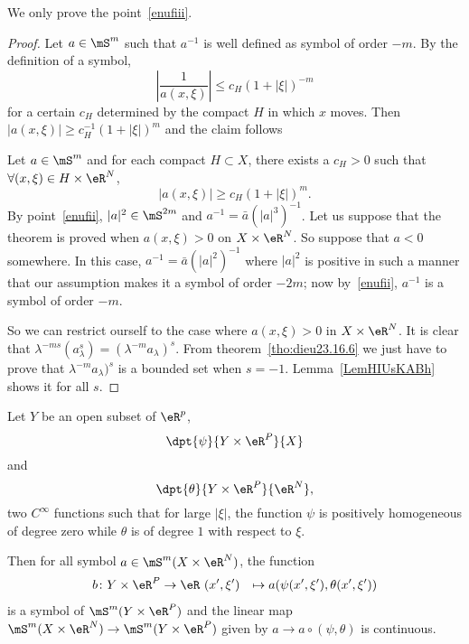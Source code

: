We only prove the point~\ref{enufiii}.

\begin{proof}
	Let $a\in\mS^m$ such that $a^{-1}$ is well defined as symbol of order $-m$. By the definition of a symbol,
	\begin{equation}
		\left| \frac{1}{a(x,\xi)}  \right|\leq c_H(1+|\xi|)^{-m}
	\end{equation}
	for a certain $c_H$ determined by the compact $H$ in which $x$ moves. Then $|a(x,\xi)|\geq c_H^{-1}(1+|\xi|)^m$ and the claim follows

	 Let $a\in\mS^m$ and for each compact $H\subset X$, there exists a $c_H>0$ such that $\forall(x,\xi)\in H\times \eR^N$,
	\[
		|a(x,\xi)|\geq c_H(1+|\xi|)^m.
	\]
	By point~\ref{enufii}, $|a|^2\in\mS^{2m}$ and $a^{-1}=\bar a (|a|^3)^{-1}$. Let us suppose that the theorem is proved when $a(x,\xi)>0$ on $X\times\eR^N$. So suppose that $a<0$ somewhere. In this case, $a^{-1}=\bar a(|a|^2)^{-1}$ where $|a|^2$ is positive in such a manner that our assumption makes it a symbol of order $-2m$; now by~\ref{enufii}, $a^{-1}$ is a symbol of order $-m$.

	So we can restrict ourself to the case where $a(x,\xi)>0$ in $X\times\eR^N$. It is clear that $\lambda^{-ms}(a_{\lambda}^s)=(\lambda^{-m}a_{\lambda})^s$. From theorem~\ref{tho:dieu23.16.6} we just have to prove that
	$\lambda^{-m}a_{\lambda})^s$ is a bounded set when $s=-1$. Lemma~\ref{LemHIUsKABh} shows it for all $s$.

\end{proof}

\begin{proposition}
	Let $Y$ be an open subset of $\eR^p$,
	\[
		\dpt{\psi}{Y\times\eR^P}{X}
	\]
	and
	\[
		\dpt{\theta}{Y\times\eR^P}{\eR^N},
	\]
	two $C^{\infty}$ functions such that for large $|\xi|$, the function $\psi$ is positively homogeneous of degree zero while $\theta$ is of degree $1$ with respect to $\xi$.

	Then for all symbol $a\in\mS^m(X\times\eR^N)$, the function
	\begin{equation}
		\begin{aligned}
			b \colon Y\times\eR^P & \to \eR\
			(x',\xi')             & \mapsto a(\psi(x',\xi'),\theta(x',\xi'))
		\end{aligned}
	\end{equation}
	is a symbol of $\mS^m(Y\times\eR^P)$ and the linear map $\mS^m(X\times\eR^N)\to\mS^m(Y\times\eR^P)$ given by $a\to a\circ(\psi,\theta)$ is continuous.


\end{proposition}

